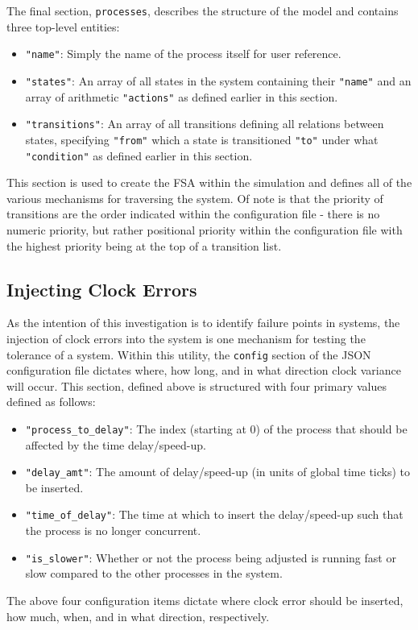 \documentclass[12pt]{extarticle}
\begin{document}
The final section, \texttt{processes}, describes the structure of the model and contains three top-level entities:
\begin{itemize}
    \item \texttt{"name"}: Simply the name of the process itself for user reference.
    \item \texttt{"states"}: An array of all states in the system containing their \texttt{"name"} and an array of arithmetic \texttt{"actions"} as defined earlier in this section.
    \item \texttt{"transitions"}: An array of all transitions defining all relations between states, specifying \texttt{"from"} which a state is transitioned \texttt{"to"} under what \texttt{"condition"} as defined earlier in this section.
\end{itemize}
This section is used to create the FSA within the simulation and defines all of the various mechanisms for traversing the system. Of note is that the priority of transitions are the order indicated within the configuration file -  there is no numeric priority, but rather positional priority within the configuration file with the highest priority being at the top of a transition list.

\subsection{Injecting Clock Errors}\label{sec:clkerr}
As the intention of this investigation is to identify failure points in systems, the injection of clock errors into the system is one mechanism for testing the tolerance of a system. Within this utility, the \texttt{config} section of the JSON configuration file dictates where, how long, and in what direction clock variance will occur. This section, defined above is structured with four primary values defined as follows: 
\begin{itemize}
    \item \texttt{"process\_to\_delay"}: The index (starting at 0) of the process that should be affected by the time delay/speed-up.
    \item \texttt{"delay\_amt"}: The amount of delay/speed-up (in units of global time ticks) to be inserted.
    \item \texttt{"time\_of\_delay"}: The time at which to insert the delay/speed-up such that the process is no longer concurrent.
    \item \texttt{"is\_slower"}: Whether or not the process being adjusted is running fast or slow compared to the other processes in the system.
\end{itemize}
The above four configuration items dictate where clock error should be inserted, how much, when, and in what direction, respectively.\\
\end{document}
